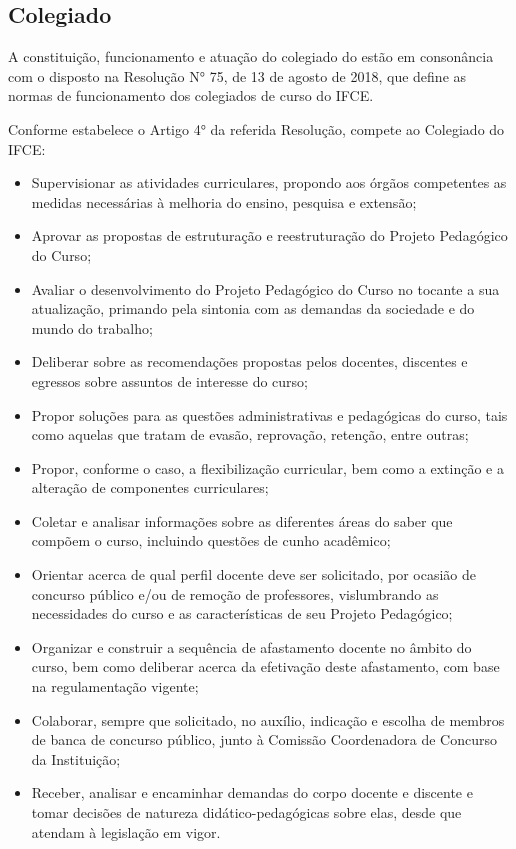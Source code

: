 \documentclass{paper}
\begin{document}
\subsection{Colegiado}


A constituição, funcionamento e atuação do colegiado do \NOMECURSO estão em consonância com o disposto na Resolução N° 75, de 13 de agosto de 2018, que define as normas de funcionamento dos colegiados de curso do IFCE.
 
Conforme estabelece o Artigo 4° da referida Resolução, compete ao Colegiado do IFCE:

\begin{itemize}
\item Supervisionar as atividades curriculares, propondo aos órgãos competentes as medidas necessárias à melhoria do ensino, pesquisa e extensão;
\item Aprovar as propostas de estruturação e reestruturação do Projeto Pedagógico do Curso;
\item Avaliar o desenvolvimento do Projeto Pedagógico do Curso no tocante a sua atualização, primando pela sintonia com as demandas da sociedade e do mundo do trabalho;
\item Deliberar sobre as recomendações propostas pelos docentes, discentes e egressos sobre assuntos de interesse do curso;
\item Propor soluções para as questões administrativas e pedagógicas do curso, tais como aquelas que tratam de evasão, reprovação, retenção, entre outras;
\item Propor, conforme o caso, a flexibilização curricular, bem como a extinção e a alteração de componentes curriculares;
\item Coletar e analisar informações sobre as diferentes áreas do saber que compõem o curso, incluindo questões de cunho acadêmico;
\item Orientar acerca de qual perfil docente deve ser solicitado, por ocasião de concurso público e/ou de remoção de professores, vislumbrando as necessidades do curso e as características de seu Projeto Pedagógico;
\item Organizar e construir a sequência de afastamento docente no âmbito do curso, bem como deliberar acerca da efetivação deste afastamento, com base na regulamentação vigente;
\item Colaborar, sempre que solicitado, no auxílio, indicação e escolha de membros de banca de concurso público, junto à Comissão Coordenadora de Concurso da Instituição;
\item Receber, analisar e encaminhar demandas do corpo docente e discente e tomar decisões de natureza didático-pedagógicas sobre elas, desde que atendam à legislação em vigor.
\end{itemize}
\end{document}
